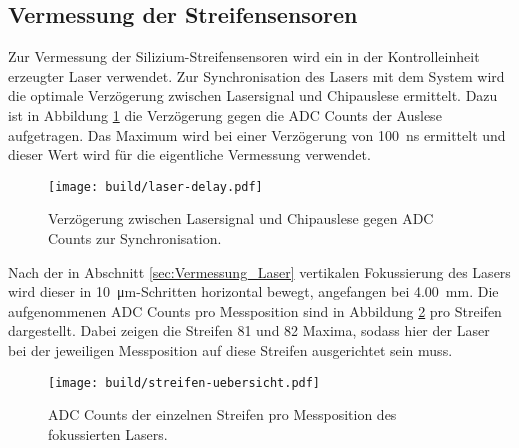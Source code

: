 \FloatBarrier
\subsection{Vermessung der Streifensensoren}
\label{sec:Vermessung-Auswertung}

Zur Vermessung der Silizium-Streifensensoren wird ein in der Kontrolleinheit erzeugter
Laser verwendet. Zur Synchronisation des Lasers mit dem System wird die
optimale Verzögerung zwischen Lasersignal und Chipauslese ermittelt.
Dazu ist in Abbildung \ref{fig:laser-delay} die Verzögerung gegen die ADC Counts
der Auslese aufgetragen.
Das Maximum wird bei einer Verzögerung von \SI{100}{\nano\second} ermittelt und
dieser Wert wird für die eigentliche Vermessung verwendet.
\begin{figure}
  \centering
  \texttt{[image: build/laser-delay.pdf]}  %
  \caption{Verzögerung zwischen Lasersignal und Chipauslese gegen ADC Counts zur
  Synchronisation.}
  \label{fig:laser-delay}
\end{figure}

Nach der in Abschnitt \ref{sec:Vermessung_Laser} vertikalen Fokussierung des
Lasers wird dieser in \SI{10}{\micro\meter}-Schritten horizontal bewegt,
angefangen bei \SI{4.00}{\milli\meter}.
Die aufgenommenen ADC Counts pro Messposition sind in Abbildung \ref{fig:streifen-uebersicht}
pro Streifen dargestellt.
Dabei zeigen die Streifen 81 und 82 Maxima, sodass hier der Laser bei der jeweiligen
Messposition auf diese Streifen ausgerichtet sein muss.
\begin{figure}
  \centering
  \texttt{[image: build/streifen-uebersicht.pdf]}  %
  \caption{ADC Counts der einzelnen Streifen pro Messposition des fokussierten
  Lasers.}
  \label{fig:streifen-uebersicht}
\end{figure}

